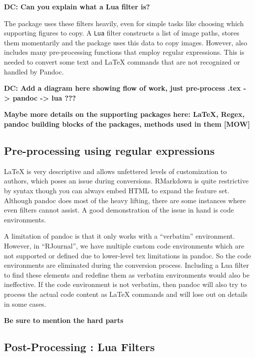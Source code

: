 \textbf{DC: Can you explain what a Lua filter is?}

The  package uses these filters heavily, even for simple tasks like choosing which supporting figures to copy. A \texttt{Lua} filter constructs a list of image paths, stores them momentarily and the package uses this data to copy images. However,  also includes many pre-processing functions that employ regular expressions. This is needed to convert some text and LaTeX commands that are not recognized or handled by Pandoc.

\textbf{DC: Add a diagram here showing flow of work, just pre-process .tex -\textgreater{} pandoc -\textgreater{} lua ???}

\textbf{Maybe more details on the supporting packages here: LaTeX, Regex, pandoc building blocks of the packages, methods used in them {[}MOW{]}}

\hypertarget{pre-processing-using-regular-expressions}{%
\subsection{Pre-processing using regular expressions}\label{pre-processing-using-regular-expressions}}

LaTeX is very descriptive and allows unfettered levels of customization to authors, which poses an issue during conversions. RMarkdown is quite restrictive by syntax though you can always embed HTML to expand the feature set. Although
pandoc does most of the heavy lifting, there are some instances where even filters cannot assist. A good demonstration of the issue in hand is code environments.

A limitation of pandoc is that it only works with a ``verbatim'' environment. However, in ``RJournal'', we have multiple custom code environments which are not supported or defined due to lower-level tex limitations in pandoc. So the code environments are eliminated during the conversion process. Including a Lua filter to find these elements and redefine them as verbatim environments would also be ineffective. If the code environment is not verbatim, then pandoc will also try to process the actual code content as LaTeX commands and will lose out on details in some cases.

\textbf{Be sure to mention the hard parts}

\hypertarget{post-processing-lua-filters}{%
\subsection{Post-Processing : Lua Filters}\label{post-processing-lua-filters}}

